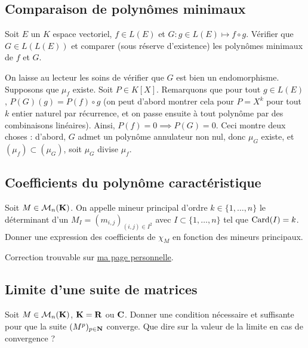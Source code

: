 \subsection{Comparaison de polynômes minimaux}
\begin{exercice}
 Soit $E$ un $K$ espace vectoriel, $f\in L(E)$ et $G:g\in L(E)\mapsto f\circ g$. Vérifier que $G\in L(L(E))$ et comparer (sous réserve d'existence) les polynômes minimaux de $f$ et $G$.
\end{exercice}

\begin{correction}
	On laisse au lecteur les soins de vérifier que $G$ est bien un endomorphisme. 
    Supposons que $\mu_f$ existe. 
    Soit $P\in K[X]$. 
    Remarquons que pour tout $g\in L(E)$, $P(G)(g)=P(f)\circ g$ (on peut d'abord montrer cela pour $P=X^k$ pour tout $k$ entier naturel par récurrence, et on passe ensuite à tout polynôme par des combinaisons linéaires).
    Ainsi, $P(f)=0\implies P(G)=0$. 
    Ceci montre deux choses : d'abord, $G$ admet un polynôme annulateur non nul, donc $\mu_G$ existe, et $(\mu_f)\subset (\mu_G)$, soit $\mu_G$ divise $\mu_f$. 
\end{correction}

\subsection{Coefficients du polynôme caractéristique}
\begin{exercice}
	Soit $M\in\mathcal M_n(\operatorname{\mathbf{K}})$. On appelle mineur principal d'ordre $k\in\lbrace1,\dots,n\rbrace$ le déterminant d'un $M_I=(m_{i,j})_{(i,j)\in I^2}$ avec $I\subset\lbrace 1,\dots,n\rbrace$ tel que $\operatorname{Card}(I)=k$. Donner une expression des coefficients de $\chi_M$ en fonction des mineurs principaux.
\end{exercice}

\begin{correction}
    Correction trouvable sur \href{https://perso.eleves.ens-rennes.fr/people/amar.ahmane}{ma page personnelle}.
\end{correction}

\subsection{Limite d'une suite de matrices}
\begin{exercice}
	Soit $M\in\mathcal M_n(\operatorname{\mathbf{K}})$, $\operatorname{\mathbf{K}} = \operatorname{\mathbf{R}}$ ou $\operatorname{\mathbf{C}}$. Donner une condition nécessaire et suffisante pour que la suite $(M^p)_{p\in\operatorname{\mathbf{N}}}$ converge. Que dire sur la valeur de la limite en cas de convergence ?
\end{exercice}

